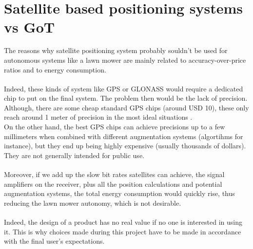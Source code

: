 \section{Satellite based positioning systems vs GoT}
The reasons why satellite positioning system probably souldn't be used for autonomous systems like a lawn mower are mainly related to accuracy-over-price ratios and to energy consumption.\\\\
Indeed, these kinds of system like GPS or GLONASS would require a dedicated chip to put on the final system. The problem then would be the lack of precision. Although, there are some cheap standard GPS chips (around USD 10), these only reach around 1 meter of precision in the most ideal situations \cite{GPSUSWebsiteAccuracy,Miller}. \\
On the other hand, the best GPS chips can achieve precisions up to a few millimeters \cite{GPSUSWebsiteAccuracy} when combined with different augmentation systems (algortihms for instance), but they end up being highly expensive (usually thousands of dollars). They are not generally intended for public use.
 \\\\
%
Moreover, if we add up the slow bit rates satellites can achieve, the signal amplifiers on the receiver, plus all the position calculations and potential augmentation systems, the total energy consumption would quickly rise,  thus reducing the lawn mower autonomy, which is not desirable.\\\\
%
Indeed, the design of a product has no real value if no one is interested in using it. This is why choices made during this project have to be made in accordance with the final user's expectations.
